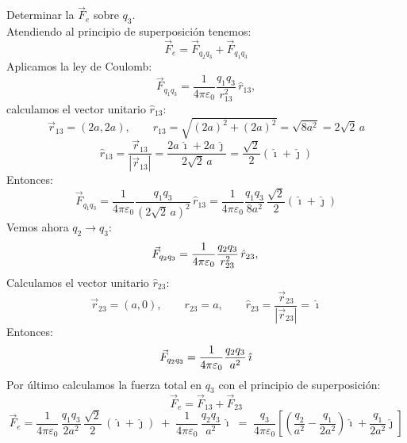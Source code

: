 \documentclass[a4paper,12pt]{article}
\begin{document}
\begin{center}
\end{center}
Determinar la $\vec{F}_e$ sobre $q_3$. \\
Atendiendo al principio de superposición tenemos:
\[
\vec{F}_e = \vec{F}_{q_2 q_3} + \vec{F}_{q_1 q_3}
\]
Aplicamos la ley de Coulomb:
\[
\vec{F}_{q_1 q_3} = \frac{1}{4\pi \varepsilon_0} \frac{q_1 q_3}{r_{13}^2} \, \hat{r}_{13}, 
\]
calculamos el vector unitario $\hat{r}_{13}$:
\[
\vec{r}_{13} = (2a,2a), 
\qquad r_{13} = \sqrt{(2a)^2+(2a)^2} = \sqrt{8a^2} = 2\sqrt{2}\,a
\]
\[
\hat{r}_{13} = \frac{\vec{r}_{13}}{|\vec{r}_{13}|} = \frac{2a\,\hat{\imath} + 2a\,\hat{\jmath}}{2\sqrt{2}\,a} 
= \frac{\sqrt{2}}{2} (\hat{\imath} + \hat{\jmath})
\]
Entonces:\\
\[
\vec{F}_{q_1 q_3} = \frac{1}{4\pi \varepsilon_0} \frac{q_1 q_3}{(2\sqrt{2}\,a)^2} \, \hat{r}_{13}
= \frac{1}{4\pi \varepsilon_0} \frac{q_1 q_3}{8a^2} \, \frac{\sqrt{2}}{2} (\hat{\imath} + \hat{\jmath})
\]
Vemos ahora $q_2 \to q_3$:\\
\[
\vec{F}_{q_2 q_3} = \frac{1}{4\pi \varepsilon_0} \frac{q_2 q_3}{r_{23}^2} \, \hat{r}_{23}, \\
\]
Calculamos el vector unitario $\hat{r}_{23}$:
\[
\vec{r}_{23} = (a,0), \qquad r_{23}=a, \qquad \hat{r}_{23} = \frac{\vec{r}_{23}}{|\vec{r}_{23}|} = \hat{\imath}
\]
Entonces:
\[
\vec{F}_{q_2 q_3} = \frac{1}{4\pi \varepsilon_0} \frac{q_2 q_3}{a^2} \, \hat{\imath}\\
\]
Por último calculamos la fuerza total en $q_3$ con el principio de superposición:
\[
\vec{F}_e = \vec{F}_{13} + \vec{F}_{23}
\]
\[
\vec{F}_e =
\frac{1}{4\pi\varepsilon_0}\,\frac{q_1 q_3}{2a^2}\,\frac{\sqrt{2}}{2}\,(\hat{\imath}+\hat{\jmath})
\;+\;
\frac{1}{4\pi\varepsilon_0}\,\frac{q_2 q_3}{a^2}\,\hat{\imath}
\;=\;
\frac{q_3}{4\pi\varepsilon_0}\!\left[
\left(\frac{q_2}{a^2}-\frac{q_1}{2a^2}\right)\hat{\imath}
+\frac{q_1}{2a^2}\hat{\jmath}
\right]
\]
\end{document}
